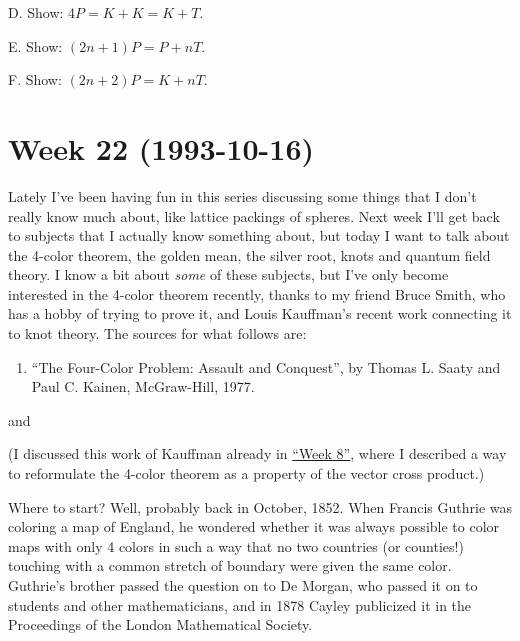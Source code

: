 \documentclass{article}
\def\tightlist{}
\renewcommand{\texttt}[1]{%
  \begingroup
  \ttfamily
  \begingroup\lccode`~=`/\lowercase{\endgroup\def~}{/\discretionary{}{}{}}%
  \begingroup\lccode`~=`[\lowercase{\endgroup\def~}{[\discretionary{}{}{}}%
  \begingroup\lccode`~=`.\lowercase{\endgroup\def~}{.\discretionary{}{}{}}%
  \catcode`/=\active\catcode`[=\active\catcode`.=\active
  \scantokens{#1\noexpand}%
  \endgroup
}
\begin{document}
D. Show: \(4P = K + K = K + T\).

E. Show: \((2n+1)P = P + nT\).

F. Show: \((2n+2)P = K + nT\).
\hypertarget{week22}{%
\section{Week 22 (1993-10-16)}\label{week22}}

Lately I've been having fun in this series discussing some things that I
don't really know much about, like lattice packings of spheres. Next
week I'll get back to subjects that I actually know something about, but
today I want to talk about the 4-color theorem, the golden mean, the
silver root, knots and quantum field theory. I know a bit about
\emph{some} of these subjects, but I've only become interested in the
4-color theorem recently, thanks to my friend Bruce Smith, who has a
hobby of trying to prove it, and Louis Kauffman's recent work connecting
it to knot theory. The sources for what follows are:

\begin{enumerate}
\def\labelenumi{\arabic{enumi})}
\tightlist
\item
  ``The Four-Color Problem: Assault and Conquest'', by Thomas L. Saaty
  and Paul C. Kainen, McGraw-Hill, 1977.
\end{enumerate}

and


(I discussed this work of Kauffman already in
\protect\hyperlink{week8}{``Week 8''}, where I described a way to
reformulate the 4-color theorem as a property of the vector cross
product.)

Where to start? Well, probably back in October, 1852. When Francis
Guthrie was coloring a map of England, he wondered whether it was always
possible to color maps with only 4 colors in such a way that no two
countries (or counties!) touching with a common stretch of boundary were
given the same color. Guthrie's brother passed the question on to De
Morgan, who passed it on to students and other mathematicians, and in
1878 Cayley publicized it in the Proceedings of the London Mathematical
Society.
\end{document}
